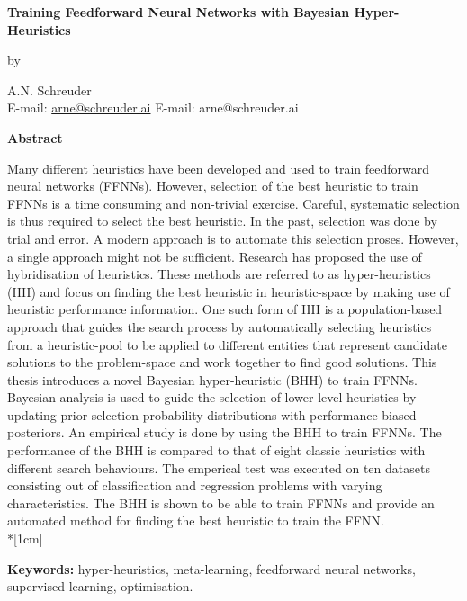 \pagestyle{empty}

\begin{center}
    \Large
    \textbf{Training Feedforward Neural Networks with Bayesian Hyper-Heuristics}
    \vspace{0.5cm}

    \normalsize
    by
    \vspace{0.5cm}

    \normalsize
    A.N. Schreuder\\
    \ifpdf
        E-mail: \href{mailto:arne@schreuder.ai}{arne@schreuder.ai}
    \else
        E-mail: arne@schreuder.ai
    \fi
    \vspace{1cm}

    \Large
    \textbf{Abstract}
\end{center}

Many different heuristics have been developed and used to train feedforward
neural networks (FFNNs).  However, selection of the best heuristic to train
FFNNs is a time consuming and non-trivial exercise. Careful, systematic
selection is thus required to select the best heuristic. In the past, selection
was done by trial and error. A modern approach is to automate this selection
proses. However, a single approach might not be sufficient. Research has
proposed the use of hybridisation of heuristics. These methods are referred to
as hyper-heuristics (HH) and focus on finding the best heuristic in
heuristic-space by making use of heuristic performance information. One such
form of HH is a population-based approach that guides the search process by
automatically selecting heuristics from a heuristic-pool to be applied to
different entities that represent candidate solutions to the problem-space and
work together to find good solutions. This thesis introduces a novel Bayesian
hyper-heuristic (BHH) to train FFNNs.  Bayesian analysis is used to guide the
selection of lower-level heuristics by updating prior selection probability
distributions with performance biased posteriors. An empirical study is done by
using the BHH to train FFNNs. The performance of the BHH is compared to that of
eight classic heuristics with different search
behaviours.  The emperical test was executed on ten datasets consisting out of classification and regression problems
with varying characteristics. The BHH is shown to be able to train FFNNs and
provide an automated method for finding the best heuristic to train the
\ac{FFNN}.\\*[1cm]
\noindent
\parbox{\textwidth}{
    \textbf{Keywords:} hyper-heuristics, meta-learning, feedforward neural
    networks, supervised learning, optimisation.
}
\vfill
\newpage

